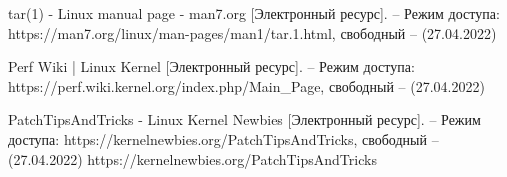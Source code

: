 \begin{thebibliography}{}
	tar(1) - Linux manual page - man7.org [Электронный ресурс]. – Режим доступа: https://man7.org/linux/man-pages/man1/tar.1.html, свободный – (27.04.2022)
	
	Perf Wiki | Linux Kernel  [Электронный ресурс]. – Режим доступа: https://perf.wiki.kernel.org/index.php/Main\_Page, свободный – (27.04.2022)
	
	PatchTipsAndTricks - Linux Kernel Newbies  [Электронный ресурс]. – Режим доступа: https://kernelnewbies.org/PatchTipsAndTricks, свободный – (27.04.2022)
	https://kernelnewbies.org/PatchTipsAndTricks
	
\end{thebibliography}
\endgroup

\pagebreak